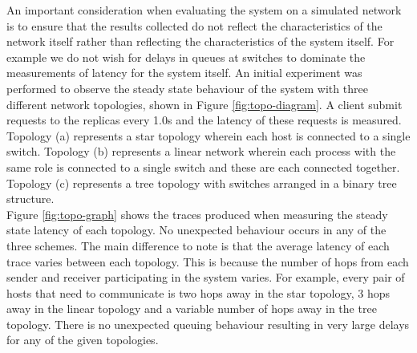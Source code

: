 An important consideration when evaluating the system on a simulated network is to ensure that the results collected do not reflect the characteristics of the network itself rather than reflecting the characteristics of the system itself. For example we do not wish for delays in queues at switches to dominate the measurements of latency for the system itself. An initial experiment was performed to observe the steady state behaviour of the system with three different network topologies, shown in Figure \ref{fig:topo-diagram}. A client submit requests to the replicas every 1.0s and the latency of these requests is measured. Topology (a) represents a star topology wherein each host is connected to a single switch. Topology (b) represents a linear network wherein each process with the same role is connected to a single switch and these are each connected together. Topology (c) represents a tree topology with switches arranged in a binary tree structure. \\

Figure \ref{fig:topo-graph} shows the traces produced when measuring the steady state latency of each topology. No unexpected behaviour occurs in any of the three schemes. The main difference to note is that the average latency of each trace varies between each topology. This is because the number of hops from each sender and receiver participating in the system varies. For example, every pair of hosts that need to communicate is two hops away in the star topology, 3 hops away in the linear topology and a variable number of hops away in the tree topology. There is no unexpected queuing behaviour resulting in very large delays for any of the given topologies. \\





